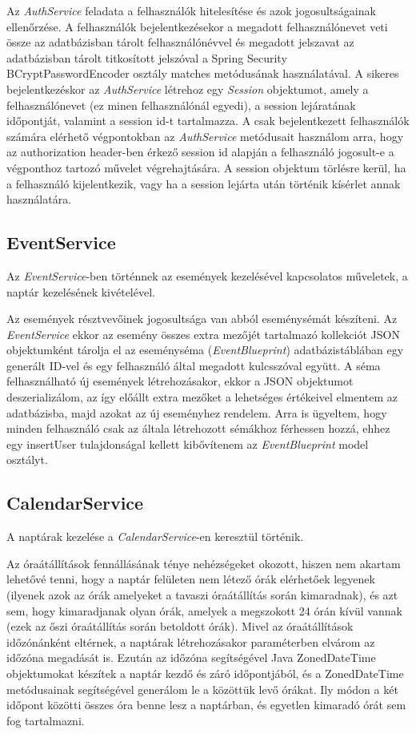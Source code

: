 \documentclass[a4paper,12pt]{report}
\theoremstyle{definition}
\theoremstyle{remark}
\begin{document}
Az \textit{AuthService} feladata a felhasználók hitelesítése és azok jogosultságainak ellenőrzése. A felhasználók bejelentkezésekor a megadott felhasználónevet veti össze az adatbázisban tárolt felhasználónévvel és megadott jelszavat az adatbázisban tárolt titkosított jelszóval a Spring Security BCryptPasswordEncoder osztály matches metódusának használatával. A sikeres bejelentkezéskor az \textit{AuthService} létrehoz egy \textit{Session} objektumot, amely a felhasználónevet (ez minen felhasználónál egyedi), a session lejáratának időpontját, valamint a session id-t tartalmazza.  A csak bejelentkezett felhasználók számára elérhető végpontokban az \textit{AuthService} metódusait használom arra, hogy az authorization header-ben érkező session id alapján a felhasználó jogosult-e a végponthoz tartozó művelet végrehajtására. A session objektum törlésre kerül, ha a felhasználó kijelentkezik, vagy ha a session lejárta után történik kísérlet annak használatára.

\subsection{EventService}

Az \textit{EventService}-ben történnek az események kezelésével kapcsolatos műveletek, a naptár kezelésének kivételével. 

Az események résztvevőinek jogosultsága van abból eseménysémát készíteni. Az \textit{EventService} ekkor az esemény összes extra mezőjét tartalmazó kollekciót JSON objektumként tárolja el az eseményséma (\textit{EventBlueprint}) adatbázistáblában egy generált ID-vel és egy felhasználó által megadott kulcsszóval együtt. A séma felhasználható új események létrehozásakor, ekkor a JSON objektumot deszerializálom, az így előállt extra mezőket a lehetséges értékeivel elmentem az adatbázisba, majd azokat az új eseményhez rendelem. Arra is ügyeltem, hogy minden felhasználó csak az általa létrehozott sémákhoz férhessen hozzá, ehhez egy insertUser tulajdonságal kellett kibővítenem az \textit{EventBlueprint} model osztályt.

\subsection{CalendarService}

A naptárak kezelése a \textit{CalendarService}-en keresztül történik.

Az óraátállítások fennállásának ténye nehézségeket okozott, hiszen nem akartam lehetővé tenni, hogy a naptár felületen nem létező órák elérhetőek legyenek (ilyenek azok az órák amelyeket a tavaszi óraátállítás során kimaradnak), és azt sem, hogy kimaradjanak olyan órák, amelyek a megszokott 24 órán kívül vannak (ezek az őszi óraátállítás során betoldott órák). Mivel az óraátállítások időzónánként eltérnek, a naptárak létrehozásakor paraméterben elvárom az időzóna megadását is. Ezután az időzóna segítségével Java ZonedDateTime objektumokat készítek a naptár kezdő és záró időpontjából, és a ZonedDateTime metódusainak segítségével generálom le a közöttük levő órákat. Ily módon a két időpont közötti összes óra benne lesz a naptárban, és egyetlen kimaradó órát sem fog tartalmazni.
\end{document}
